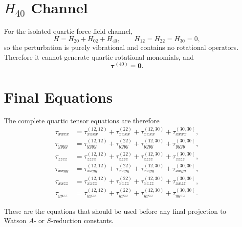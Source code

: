 \documentclass[11pt]{article}
\begin{document}
\section{$H_{40}$ Channel}
For the isolated quartic force-field channel,
\begin{equation}
H = H_{20} + H_{02} + H_{40},
\qquad H_{12}=H_{22}=H_{30}=0,
\end{equation}
so the perturbation is purely vibrational and contains no rotational operators.
Therefore it cannot generate quartic rotational monomials, and
\begin{equation}
\bm{\tau}^{(40)} = \bm{0}.
\end{equation}

\section{Final Equations}
The complete quartic tensor equations are therefore
\begin{align}
\tau_{xxxx} &= \tau^{(12,12)}_{xxxx} + \tau^{(22)}_{xxxx} + \tau^{(12,30)}_{xxxx} + \tau^{(30,30)}_{xxxx}, \\
\tau_{yyyy} &= \tau^{(12,12)}_{yyyy} + \tau^{(22)}_{yyyy} + \tau^{(12,30)}_{yyyy} + \tau^{(30,30)}_{yyyy}, \\
\tau_{zzzz} &= \tau^{(12,12)}_{zzzz} + \tau^{(22)}_{zzzz} + \tau^{(12,30)}_{zzzz} + \tau^{(30,30)}_{zzzz}, \\
\tau_{xxyy} &= \tau^{(12,12)}_{xxyy} + \tau^{(22)}_{xxyy} + \tau^{(12,30)}_{xxyy} + \tau^{(30,30)}_{xxyy}, \\
\tau_{xxzz} &= \tau^{(12,12)}_{xxzz} + \tau^{(22)}_{xxzz} + \tau^{(12,30)}_{xxzz} + \tau^{(30,30)}_{xxzz}, \\
\tau_{yyzz} &= \tau^{(12,12)}_{yyzz} + \tau^{(22)}_{yyzz} + \tau^{(12,30)}_{yyzz} + \tau^{(30,30)}_{yyzz}.
\end{align}

These are the equations that should be used before any final projection to
Watson $A$- or $S$-reduction constants.
\end{document}
